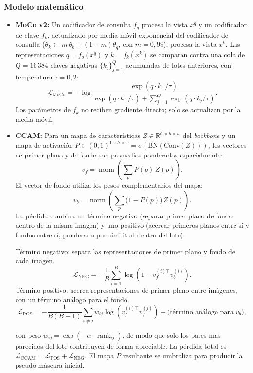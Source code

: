 \subsubsection{Modelo matemático}
\begin{itemize}
    \item \textbf{MoCo v2:} Un codificador de consulta $f_q$ procesa la vista $x^q$ y un codificador de clave $f_k$, actualizado por media móvil exponencial del codificador de consulta ($\theta_k\leftarrow m\,\theta_k+(1-m)\theta_q$, con $m=0{,}99$), procesa la vista $x^k$. Las representaciones $q=f_q(x^q)$ y $k=f_k(x^k)$ se comparan contra una cola de $Q=16\,384$ claves negativas $\{k_j\}_{j=1}^{Q}$ acumuladas de lotes anteriores, con temperatura $\tau=0{,}2$:
\begin{equation}
 \mathcal L_{\mathrm{MoCo}}=-\log\frac{\exp(q\cdot k_+/\tau)}{\exp(q\cdot k_+/\tau)+\sum_{j=1}^{Q}\exp(q\cdot k_j/\tau)}.
 \label{eq:moco-loss-s6}
\end{equation}
Los parámetros de $f_k$ no reciben gradiente directo; solo se actualizan por la media móvil.
\item 
\textbf{CCAM:} Para un mapa de características $Z\in\mathbb{R}^{C\times h\times w}$ del \textit{backbone} y un mapa de activación $P\in(0,1)^{1\times h\times w}=\sigma(\mathrm{BN}(\mathrm{Conv}(Z)))$, los vectores de primer plano y de fondo son promedios ponderados espacialmente:
\begin{equation}
 v_f=\operatorname{norm}\left(\sum_{p} P(p)\,Z(p)\right).
 \label{eq:ccam-vectores-s6}
\end{equation}
El vector de fondo utiliza los pesos complementarios del mapa:
\begin{equation}
 v_b=\operatorname{norm}\left(\sum_{p}\bigl(1-P(p)\bigr)\,Z(p)\right).
\end{equation}
La pérdida combina un término negativo (separar primer plano de fondo dentro de la misma imagen) y uno positivo (acercar primeros planos entre sí y fondos entre sí, ponderado por similitud dentro del lote):

\noindent Término negativo: separa las representaciones de primer plano y fondo de cada imagen.
\begin{equation}
 \mathcal L_{\mathrm{NEG}}=-\frac{1}{B}\sum_{i=1}^{B}\log\left(1-v_f^{(i)\top}v_b^{(i)}\right).
\end{equation}
\noindent Término positivo: acerca representaciones de primer plano entre imágenes, con un término análogo para el fondo.
\begin{equation}
 \mathcal L_{\mathrm{POS}}=-\frac{1}{B(B-1)}\sum_{i\neq j} w_{ij}\log\left(v_f^{(i)\top}v_f^{(j)}\right) + \text{(término análogo para } v_b\text{)},
\end{equation}

con peso $w_{ij}=\exp(-\alpha\cdot\operatorname{rank}_{ij})$, de modo que solo los pares más parecidos del lote contribuyen de forma apreciable. La pérdida total es $\mathcal L_{\mathrm{CCAM}}=\mathcal L_{\mathrm{POS}}+\mathcal L_{\mathrm{NEG}}$. El mapa $P$ resultante se umbraliza para producir la pseudo-máscara inicial.
\end{itemize}



